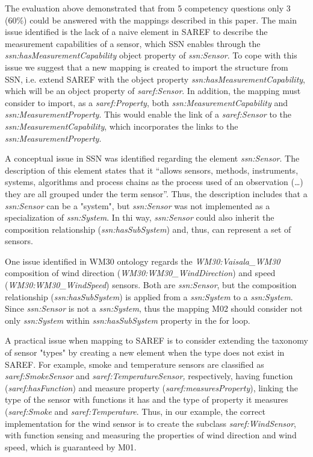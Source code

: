 \documentclass{sig-alternate-05-2015}
\begin{document}
The evaluation above demonstrated that from 5 competency questions only 3 (60\%) could be answered with the mappings described in this paper. The main issue identified is the lack of a naive element in SAREF to describe the measurement capabilities of a sensor, which SSN enables through the \textit{ssn:\-hasMeasurementCapability} object property of \textit{ssn:\-Sensor}. To cope with this issue we suggest that a new mapping is created to import the structure from SSN, i.e. extend SAREF with the object property \textit{ssn:\-has\-Measurement\-Capability}, which will be an object property of \textit{saref:\-Sensor}. In addition, the mapping must consider to import, as a \textit{saref:\-Property}, both \textit{ssn:\-Measurement\-Capability} and \textit{ssn:\-Measurement\-Property}. This would enable the link of a \textit{saref:\-Sensor} to the \textit{ssn:\-Measurement\-Capability}, which incorporates the links to the \textit{ssn:\-Measurement\-Property}. 

A conceptual issue in SSN was identified regarding the element \textit{ssn:\-Sensor}. The description of this element states that it “allows sensors, methods, instruments, systems, algorithms and process chains as the process used of an observation (…) they are all grouped under the term sensor”. Thus, the description includes that a \textit{ssn:\-Sensor} can be a "system", but \textit{ssn:\-Sensor} was not implemented as a specialization of \textit{ssn:\-System}. In thi way, \textit{ssn:\-Sensor} could also inherit the composition relationship (\textit{ssn:\-hasSubSystem}) and, thus, can represent a set of sensors. 

One issue identified in WM30 ontology regards the \textit{WM30:\-Vaisala\-\_WM30} composition of wind direction (\textit{WM30:\-WM30\-\_Wind\-Direction}) and speed (\textit{WM30:\-WM30\-\_WindSpeed}) sensors. Both are \textit{ssn:\-Sensor}, but the composition relationship (\textit{ssn:\-hasSubSystem}) is applied from a \textit{ssn:\-System} to a \textit{ssn:\-System}. Since \textit{ssn:\-Sensor} is not a \textit{ssn:\-System}, thus the mapping M02 should consider not only \textit{ssn:\-System} within \textit{ssn:\-hasSubSystem} property in the for loop. 

A practical issue when mapping to SAREF is to consider extending the taxonomy of sensor "types" by creating a new element when the type does not exist in SAREF. For example, smoke and temperature sensors are classified as \textit{saref:\-SmokeSensor} and \textit{saref:\-TemperatureSensor,} respectively, having  function (\textit{saref:\-hasFunction}) and measure property (\textit{saref:\-measuresProperty}), linking the type of the sensor with functions it has and the type of property it measures (\textit{saref:\-Smoke} and \textit{saref:\-Temperature}. Thus, in our example, the correct implementation for the wind sensor is to create the subclass \textit{saref:\-WindSensor}, with function sensing and measuring the properties of wind direction and wind speed, which is guaranteed by M01. 
\end{document}
